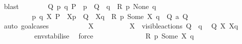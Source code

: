 \begin{isabellebody}
\ blast\isanewline
\ \ \ \ \ \ \isamarkupfalse%
\ {\isacartoucheopen}{\isasymexists}Q{\isacharprime}{\kern0pt}{\isachardot}{\kern0pt}\ {\isacharparenleft}{\kern0pt}{\isacharparenleft}{\kern0pt}{\isasymexists}p\ q{\isachardot}{\kern0pt}\ P{\isacharprime}{\kern0pt}\ {\isacharequal}{\kern0pt}\ {\isasymtheta}{\isacharparenleft}{\kern0pt}p{\isacharparenright}{\kern0pt}\ {\isasymand}\ Q{\isacharprime}{\kern0pt}\ {\isacharequal}{\kern0pt}\ {\isasymtheta}{\isacharparenleft}{\kern0pt}q{\isacharparenright}{\kern0pt}\ {\isasymand}\ R\ p\ None\ q{\isacharparenright}{\kern0pt}\ \isanewline
\ \ \ \ \ \ \ \ {\isasymor}\ {\isacharparenleft}{\kern0pt}{\isasymexists}p\ q\ X{\isachardot}{\kern0pt}\ P{\isacharprime}{\kern0pt}\ {\isacharequal}{\kern0pt}\ {\isasymtheta}{\isacharbrackleft}{\kern0pt}X{\isacharbrackright}{\kern0pt}{\isacharparenleft}{\kern0pt}p{\isacharparenright}{\kern0pt}\ {\isasymand}\ Q{\isacharprime}{\kern0pt}\ {\isacharequal}{\kern0pt}\ {\isasymtheta}{\isacharbrackleft}{\kern0pt}X{\isacharbrackright}{\kern0pt}{\isacharparenleft}{\kern0pt}q{\isacharparenright}{\kern0pt}\ {\isasymand}\ R\ p\ {\isacharparenleft}{\kern0pt}Some\ X{\isacharparenright}{\kern0pt}\ q{\isacharparenright}{\kern0pt}{\isacharparenright}{\kern0pt}\ {\isasymand}\ Q\ {\isasymlongmapsto}\isactrlsup {\isasymtheta}a\ Q{\isacharprime}{\kern0pt}{\isacartoucheclose}\isanewline
\ \ \ \ \ \ \isamarkupfalse%
\ {\isacharparenleft}{\kern0pt}auto{\isacharcomma}{\kern0pt}\ goal{\isacharunderscore}{\kern0pt}cases{\isacharparenright}{\kern0pt}\isanewline
\ \ \ \ \ \ \ \ \isamarkupfalse%
\ {\isacharparenleft}{\kern0pt}{}\ X{\isacharparenright}{\kern0pt}\isanewline
\ \ \ \ \ \ \ \ \isamarkupfalse%
\ {\isacartoucheopen}X\ {\isasymsubseteq}\ visible{\isacharunderscore}{\kern0pt}actions{\isacartoucheclose}\ {\isacartoucheopen}Q\ {\isacharequal}{\kern0pt}\ {\isasymtheta}{\isacharparenleft}{\kern0pt}q{\isacharparenright}{\kern0pt}{\isacartoucheclose}\ \isamarkupfalse%
\ {\isacartoucheopen}Q\ {\isasymlongmapsto}\isactrlsup {\isasymtheta}{\isasymepsilon}{\isacharbrackleft}{\kern0pt}X{\isacharbrackright}{\kern0pt}\ {\isasymtheta}{\isacharbrackleft}{\kern0pt}X{\isacharbrackright}{\kern0pt}{\isacharparenleft}{\kern0pt}q{\isacharparenright}{\kern0pt}{\isacartoucheclose}\ \isanewline
\ \ \ \ \ \ \ \ \isamarkupfalse%
\ env{\isacharunderscore}{\kern0pt}stabilise\ \isamarkupfalse%
\ force\isanewline
\ \ \ \ \isanewline
\ \ \ \ \ \ \ \ \isamarkupfalse%
\ {\isacartoucheopen}R\ p\ {\isacharparenleft}{\kern0pt}Some\ X{\isacharparenright}{\kern0pt}\ q{\isacartoucheclose}\ \isamarkupfalse%

\end{isabellebody}
